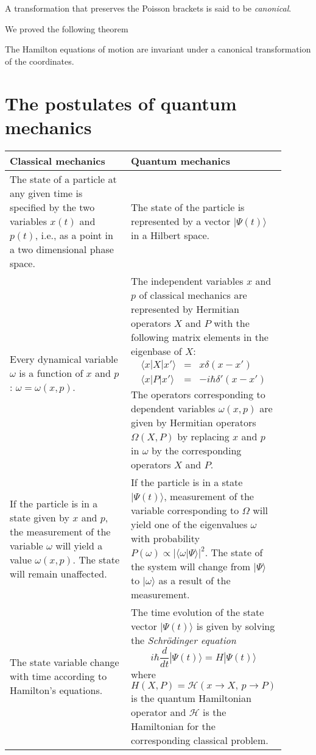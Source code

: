 \documentclass[11pt,fleqn]{book} %
\newcommand{\bra}[1]{\langle #1|}
\newcommand{\ket}[1]{| #1\rangle}
\newcommand{\scalar}[2]{\langle #1| #2\rangle}
\begin{document}
\begin{definition}
    A transformation that preserves the Poisson brackets is said to be \textit{canonical}.
\end{definition}

We proved the following theorem
\begin{theorem}
    The Hamilton equations of motion are invariant under a canonical transformation of the coordinates.
\end{theorem}

\chapter{The postulates of quantum mechanics}
\begin{center}
    \begin{tabular}{p{0.45\linewidth} | p{0.45\linewidth}}
    Classical mechanics & Quantum mechanics \\
    \hline
    The state of a particle at any given time is specified by the two variables $x(t)$ and $p(t)$, i.e., as a point
    in a two dimensional phase space. 
    & The state of the particle is represented by a vector $\ket{\Psi(t)}$ in a Hilbert space.
    \\\hline
    Every dynamical variable $\omega$ is a function of $x$ and $p$: $\omega=\omega(x,p)$.
    & The independent variables $x$ and $p$ of classical mechanics are represented by Hermitian operators $X$ and $P$ with the
    following matrix elements in the eigenbase of $X$:
    \vbox{
    \begin{eqnarray*}
        \bra{x}X\ket{x'} &=& x\delta(x-x') \\
        \bra{x}P\ket{x'} &=& -i\hbar\delta'(x-x')
    \end{eqnarray*}
    }
    The operators corresponding to dependent variables $\omega(x, p)$ are given by Hermitian operators $\Omega(X, P)$ by replacing
    $x$ and $p$ in $\omega$ by the corresponding operators $X$ and $P$.
    \\\hline
    If the particle is in a state given by $x$ and $p$, the measurement of the variable $\omega$ will yield a value $\omega(x,p)$.
    The state will remain unaffected.
    &If the particle is in a state $\ket{\Psi(t)}$, measurement of the variable corresponding to $\Omega$ will yield one of the
    eigenvalues $\omega$ with probability $P(\omega)\propto\vert\scalar{\omega}{\Psi}\vert^2$. The state of the system will change
    from $\ket{\Psi}$ to $\ket{\omega}$ as a result of the measurement.
    \\\hline
    The state variable change with time according to Hamilton's equations.
    &The time evolution of the state vector $\ket{\Psi(t)}$ is given by solving the \textit{Schr\"odinger equation}
    \vbox{
        \begin{equation*}
            i\hbar\frac{d}{dt}\ket{\Psi(t)}=H\ket{\Psi(t)}
        \end{equation*}
    }
    where $H(X,P) = \mathcal{H}(x\to X,\, p\to P)$ is the quantum Hamiltonian operator and $\mathcal{H}$ is the Hamiltonian for
    the corresponding classical problem.
    \end{tabular}
\end{center}

\printbibliography
\end{document}
